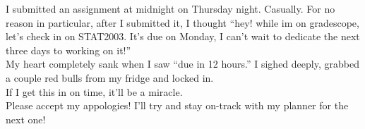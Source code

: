 \documentclass[a4paper,12pt]{report}
\begin{document}
I submitted an assignment at midnight on Thursday night. Casually. For no reason in particular, after I submitted it, I thought ``hey! while im on gradescope, let's check in on STAT2003. It's due on Monday, I can't wait to dedicate the next three days to working on it!'' \\

My heart completely sank when I saw ``due in 12 hours.'' I sighed deeply, grabbed a couple red bulls from my fridge and locked in. \\

If I get this in on time, it'll be a miracle. \\

Please accept my appologies! I'll try and stay on-track with my planner for the next one!
\end{document}
